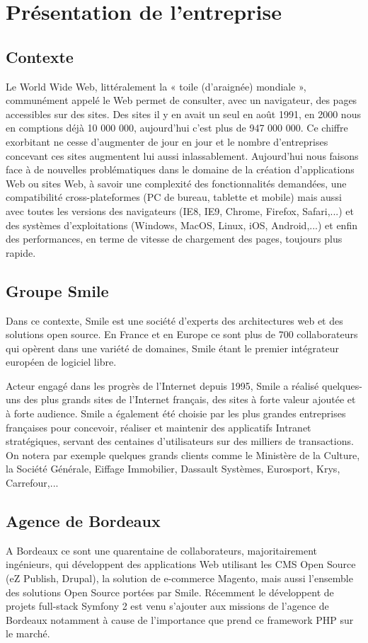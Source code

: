 \documentclass[a4paper,11pt,twoside]{report}
\begin{document}
\tableofcontents

\chapter{Présentation de l'entreprise}
  \section{Contexte}
  Le World Wide Web, littéralement la « toile (d’araignée) mondiale », communément appelé le Web permet de consulter, avec un navigateur, des pages accessibles sur des sites. Des sites il y en avait un seul en août 1991, en 2000 nous en comptions déjà 10 000 000, aujourd'hui c'est plus de 947 000 000. Ce chiffre exorbitant ne cesse d'augmenter de jour en jour et le nombre d'entreprises concevant ces sites augmentent lui aussi inlassablement. Aujourd'hui nous faisons face à de nouvelles problématiques dans le domaine de la création d'applications Web ou sites Web, à savoir une complexité des fonctionnalités demandées, une compatibilité cross-plateformes (PC de bureau, tablette et mobile) mais aussi avec toutes les versions des navigateurs (IE8, IE9, Chrome, Firefox, Safari,...) et des systèmes d'exploitations (Windows, MacOS, Linux, iOS, Android,...) et enfin des performances, en terme de vitesse de chargement des pages, toujours plus rapide.
  \section{Groupe Smile}
  Dans ce contexte, Smile est une société d'experts des architectures web et des solutions open source. En France et en Europe ce sont plus de 700 collaborateurs qui opèrent dans une variété de domaines, Smile étant le premier intégrateur européen de logiciel libre.\newline

  Acteur engagé dans les progrès de l’Internet depuis 1995, Smile a réalisé quelques-uns des plus grands sites de l'Internet français, des sites à forte valeur ajoutée et à forte audience. Smile a également été choisie par les plus grandes entreprises françaises pour concevoir, réaliser et maintenir des applicatifs Intranet stratégiques, servant des centaines d'utilisateurs sur des milliers de transactions. On notera par exemple quelques grands clients comme le Ministère de la Culture, la Société Générale, Eiffage Immobilier, Dassault Systèmes, Eurosport, Krys, Carrefour,...
  \section{Agence de Bordeaux}
  A Bordeaux ce sont une quarentaine de collaborateurs, majoritairement ingénieurs, qui développent des applications Web utilisant les CMS Open Source (eZ Publish, Drupal), la solution de e-commerce Magento, mais aussi l’ensemble des solutions Open Source portées par Smile. Récemment le développent de projets full-stack Symfony 2 est venu s'ajouter aux missions de l'agence de Bordeaux notamment à cause de l'importance que prend ce framework PHP sur le marché.\newline
\end{document}
